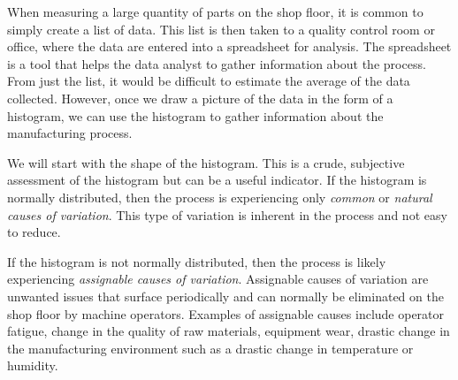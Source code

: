 \documentclass{ximera}
\begin{document}
When measuring a large quantity of parts on the shop floor, it is common to simply create a list of data.  This list is then taken to a quality control room or office, where the data are entered into a spreadsheet for analysis. The spreadsheet is a tool that helps the data analyst to gather information about the process. From just the list, it would be difficult to estimate the average of the data collected. However, once we draw a picture of the data in the form of a histogram, we can use the histogram to gather information about the manufacturing process. 

We will start with the shape of the histogram.  This is a crude, subjective assessment of the histogram but can be a useful indicator.  If the histogram is normally distributed, then the process is experiencing only \emph{common} or \emph{natural causes of variation}. This type of variation is inherent in the process and not easy to reduce.  

If the histogram is not normally distributed, then the process is likely experiencing \emph{assignable causes of variation}.  Assignable causes of variation are unwanted issues that surface periodically and can normally be eliminated on the shop floor by machine operators.  Examples of assignable causes include operator fatigue, change in the quality of raw materials, equipment wear, drastic change in the manufacturing environment such as a drastic change in temperature or humidity.
\end{document}
